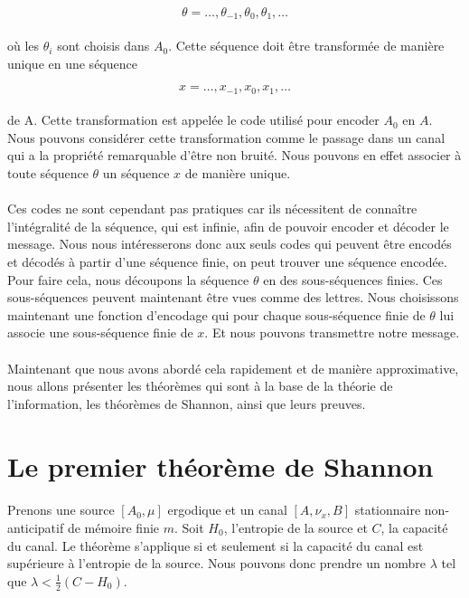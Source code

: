 \documentclass[a4paper,12pt]{article}
\begin{document}
	\[\theta = \dots,\theta_{-1},\theta_{0},\theta_{1},\dots\]

	\paragraph{}
	où les $\theta_i$ sont choisis dans $A_0$. Cette séquence doit être transformée de manière unique en une séquence

	\[x = \dots,x_{-1},x_{0},x_{1},\dots\]

	\paragraph{}
	de A. Cette transformation est appelée le code utilisé pour encoder $A_0$ en $A$. Nous pouvons considérer cette 
	transformation comme le passage dans un canal qui a la propriété remarquable d'être non bruité.
	Nous pouvons en effet associer à toute séquence $\theta$ un séquence $x$ de manière unique. 

	\paragraph{}
	Ces codes ne sont cependant pas pratiques car ils nécessitent de connaître l'intégralité de la séquence, qui est 
	infinie, afin de pouvoir encoder et décoder le message. Nous  nous intéresserons donc aux seuls codes qui peuvent être encodés et 
	décodés à partir d'une séquence 
	finie, on peut trouver une séquence encodée. Pour faire cela, nous découpons la séquence $\theta$ en des sous-séquences finies. 
	Ces sous-séquences peuvent maintenant être vues comme des lettres. Nous choisissons maintenant une fonction d'encodage qui pour 
	chaque sous-séquence finie de $\theta$ lui associe une sous-séquence finie de $x$. Et nous pouvons transmettre notre message.
	
	\paragraph{}
	Maintenant que nous avons abordé cela rapidement et de manière 
	approximative, nous allons présenter les théorèmes qui sont à la base
	de la théorie de l'information, les théorèmes
	de Shannon, ainsi que leurs preuves.

\section{Le premier théorème de Shannon}

	\paragraph{}
	Prenons une source $[A_0,\mu]$ ergodique et un canal $[A,\nu_x,B]$ stationnaire non-anticipatif de mémoire finie $m$. 
	Soit $H_0$, l'entropie de la source et $C$, la capacité du canal. Le théorème s'applique si et seulement si la capacité 
	du canal est supérieure à l'entropie de la source. Nous pouvons donc prendre un nombre $\lambda$ tel que $\lambda<\frac{1}{2}(C-H_0)$. 
\end{document}
